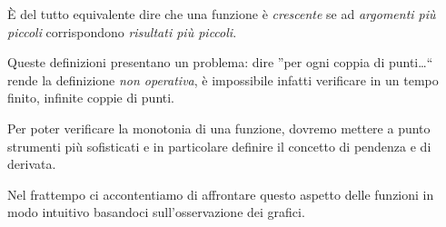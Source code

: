  È del tutto equivalente dire che una funzione è \emph{crescente} se ad 
\emph{argomenti più piccoli} corrispondono \emph{risultati più piccoli}.

\begin{osservazione}
Queste definizioni presentano un problema: dire 
''per ogni coppia di punti\dots`` rende la definizione \emph{non operativa},
è impossibile infatti verificare in un tempo finito, infinite coppie di punti.

Per poter verificare la monotonia di una funzione, dovremo mettere a punto 
strumenti più sofisticati e in particolare definire il concetto di pendenza 
e di derivata.

Nel frattempo ci accontentiamo di affrontare questo aspetto delle funzioni in 
modo intuitivo basandoci sull'osservazione dei grafici.
\end{osservazione}

